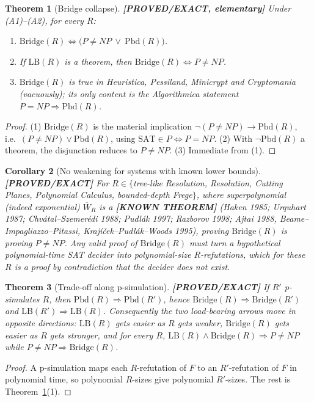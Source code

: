 \documentclass[11pt]{article}
\newtheorem{theorem}{Theorem}
\newtheorem{corollary}[theorem]{Corollary}
\theoremstyle{definition}
\theoremstyle{remark}
\newcommand{\SAT}{\mathrm{SAT}}
\newcommand{\Wb}{\overline W}
\newcommand{\Br}{\mathrm{Bridge}}
\newcommand{\Pbd}{\mathrm{Pbd}}
\newcommand{\LB}{\mathrm{LB}}
\newcommand{\status}[1]{\textbf{[#1]}}
\begin{document}
\begin{theorem}[Bridge collapse]\label{thm:collapse}\status{PROVED/EXACT, elementary}
Under (A1)--(A2), for every $R$:
\begin{enumerate}
\item $\Br(R)\iff\bigl(P\ne NP\ \vee\ \Pbd(R)\bigr)$.
\item If $\LB(R)$ is a theorem, then $\Br(R)\iff P\ne NP$.
\item $\Br(R)$ is true in Heuristica, Pessiland, Minicrypt and Cryptomania (vacuously); its
only content is the Algorithmica statement $P=NP\Rightarrow\Pbd(R)$.
\end{enumerate}
\end{theorem}
\begin{proof}
(1) $\Br(R)$ is the material implication $\neg(P\ne NP)\to\Pbd(R)$, i.e.\
$(P\ne NP)\vee\Pbd(R)$, using $\SAT\in P\iff P=NP$.
(2) With $\neg\Pbd(R)$ a theorem, the disjunction reduces to $P\ne NP$.
(3) Immediate from (1).
\end{proof}

\begin{corollary}[No weakening for systems with known lower bounds]\status{PROVED/EXACT}
For $R\in\{$tree-like Resolution, Resolution, Cutting Planes, Polynomial Calculus,
bounded-depth Frege$\}$, where superpolynomial (indeed exponential) $\Wb_R$ is a
\status{KNOWN THEOREM} (Haken 1985; Urquhart 1987; Chv\'atal--Szemer\'edi 1988; Pudl\'ak 1997;
Razborov 1998; Ajtai 1988, Beame--Impagliazzo--Pitassi, Kraj\'i\v{c}ek--Pudl\'ak--Woods 1995),
proving $\Br(R)$ \emph{is} proving $P\ne NP$. Any valid proof of $\Br(R)$ must turn a hypothetical
polynomial-time SAT decider into polynomial-size $R$-refutations, which for these $R$ is a proof
by contradiction that the decider does not exist.
\end{corollary}

\begin{theorem}[Trade-off along p-simulation]\label{thm:order}\status{PROVED/EXACT}
If $R'$ p-simulates $R$, then $\Pbd(R)\Rightarrow\Pbd(R')$, hence $\Br(R)\Rightarrow\Br(R')$ and
$\LB(R')\Rightarrow\LB(R)$. Consequently the two load-bearing arrows move in opposite directions:
$\LB(R)$ gets easier as $R$ gets weaker, $\Br(R)$ gets easier as $R$ gets stronger, and for every
$R$, $\LB(R)\wedge\Br(R)\Rightarrow P\ne NP$ while $P\ne NP\Rightarrow\Br(R)$.
\end{theorem}
\begin{proof}
A p-simulation maps each $R$-refutation of $F$ to an $R'$-refutation of $F$ in polynomial time, so
polynomial $R$-sizes give polynomial $R'$-sizes. The rest is Theorem~\ref{thm:collapse}(1).
\end{proof}
\end{document}
